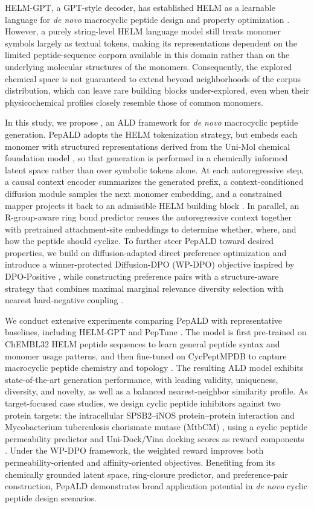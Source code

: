 HELM-GPT, a GPT-style decoder, has established HELM as a learnable language for \textit{de novo} macrocyclic peptide design and property optimization \citep{ref_helm_gpt}. However, a purely string-level HELM language model still treats monomer symbols largely as textual tokens, making its representations dependent on the limited peptide-sequence corpora available in this domain rather than on the underlying molecular structures of the monomers. Consequently, the explored chemical space is not guaranteed to extend beyond neighborhoods of the corpus distribution, which can leave rare building blocks under-explored, even when their physicochemical profiles closely resemble those of common monomers.

In this study, we propose \mytool, an ALD framework for \textit{de novo} macrocyclic peptide generation. PepALD adopts the HELM tokenization strategy, but embeds each monomer with structured representations derived from the Uni-Mol chemical foundation model \citep{ref_unimol}, so that generation is performed in a chemically informed latent space rather than over symbolic tokens alone. At each autoregressive step, a causal context encoder summarizes the generated prefix, a context-conditioned diffusion module samples the next monomer embedding, and a constrained mapper projects it back to an admissible HELM building block \citep{ref_ddpm,ref_ddim}. In parallel, an R-group-aware ring bond predictor reuses the autoregressive context together with pretrained attachment-site embeddings to determine whether, where, and how the peptide should cyclize. To further steer PepALD toward desired properties, we build on diffusion-adapted direct preference optimization \citep{ref_dpo,ref_diffusion_dpo} and introduce a winner-protected Diffusion-DPO (WP-DPO) objective inspired by DPO-Positive \citep{ref_dpop}, while constructing preference pairs with a structure-aware strategy that combines maximal marginal relevance diversity selection with nearest hard-negative coupling \citep{ref_mmr}.

We conduct extensive experiments comparing PepALD with representative baselines, including HELM-GPT and PepTune \citep{ref_helm_gpt,ref_peptune}. The model is first pre-trained on ChEMBL32 HELM peptide sequences to learn general peptide syntax and monomer usage patterns, and then fine-tuned on CycPeptMPDB to capture macrocyclic peptide chemistry and topology \citep{ref_chembl,ref_cycpeptmpdb}. The resulting ALD model exhibits state-of-the-art generation performance, with leading validity, uniqueness, diversity, and novelty, as well as a balanced nearest-neighbor similarity profile. As target-focused case studies, we design cyclic peptide inhibitors against two protein targets: the intracellular SPSB2--iNOS protein--protein interaction \citep{sadek2018cyclic} and Mycobacterium tuberculosis chorismate mutase (MtbCM) \citep{van2025active}, using a cyclic peptide permeability predictor and Uni-Dock/Vina docking scores as reward components \citep{ref_unidock}. Under the WP-DPO framework, the weighted reward improves both permeability-oriented and affinity-oriented objectives. Benefiting from its chemically grounded latent space, ring-closure predictor, and preference-pair construction, PepALD demonstrates broad application potential in \textit{de novo} cyclic peptide design scenarios.

